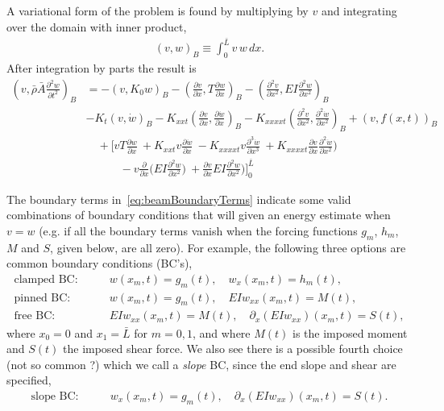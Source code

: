 \documentclass[11pt]{article}
\newcommand{\rhos}{\bar{\rho}}
\newcommand{\As}{\bar{A}}
\newcommand{\Ls}{\bar{L}}
\newcommand{\wt}{\dot{w}}
\begin{document}
A variational form of the problem is found by multiplying by $v$ and integrating over the domain with inner product,
\begin{align}
   (v,w)_B \equiv \int_0^{\Ls} v \, w \, dx. 
\end{align}
After integration by parts the result is 
\begin{align}
 \left( v,  \rhos \As \frac{\partial^2 w}{\partial t^2} \right)_B  &= 
                  - \left( v , K_0 w \right)_B
                  - \left( \frac{\partial v}{\partial x} , T \frac{\partial w}{\partial x} \right)_B
                  -\left(\frac{\partial^2 v}{\partial x^2}, E I \frac{\partial^2 w}{\partial x^2}\right)_B  \\
            & - K_{t} \left( v ,\wt \right)_B
              - K_{xxt} \left( \frac{\partial v}{\partial x} ,\frac{\partial \wt}{\partial x} \right)_B
              - K_{xxxxt} \left( \frac{\partial^2 v}{\partial x^2} ,\frac{\partial^2 \wt}{\partial x^2} \right)_B
             + ( v, f(x,t))_B \\
             &\quad  +   \Big[ v T \frac{\partial w}{\partial x} 
                      ~ + K_{xxt}v  \frac{\partial \wt}{\partial x}
                      ~ -K_{xxxxt} v \frac{\partial^3 \wt}{\partial x^3} 
                      ~ + K_{xxxxt} \frac{\partial v}{\partial x}\frac{\partial^2 \wt}{\partial x^2}\Big)  \\
              &\qquad\quad -v \frac{\partial}{\partial x}\Big( E I \frac{\partial^2 w}{\partial x^2}\Big) 
                      ~ + \frac{\partial v}{\partial x}E I \frac{\partial^2 w}{\partial x^2}\Big)  
                      \Big]_0^{\Ls}   \label{eq:beamBoundaryTerms}
\end{align}

The boundary terms in~\eqref{eq:beamBoundaryTerms} indicate some valid combinations of boundary conditions that will given an energy estimate
when $v=w$ (e.g. if all the boundary terms vanish when the forcing functions $g_m$, $h_m$, $M$ and $S$, given below, are all zero). 
For example, the following three options are common boundary conditions (BC's), 
\begin{align}
   \text{clamped BC:}\quad & \quad w(x_m,t)=g_m(t),\quad  w_x(x_m,t)=h_m(t),  \\
   \text{pinned BC:} \quad & \quad w(x_m,t)=g_m(t), \quad E I w_{xx}(x_m,t)=M(t), \\
   \text{free BC:}   \quad & \quad  E I w_{xx}(x_m,t)=M(t), \quad \partial_x( E I w_{xx})(x_m,t)=S(t),
\end{align}
where $x_0=0$ and $x_1=\Ls$ for $m=0,1$, and 
where $M(t)$ is the imposed moment and $S(t)$ the imposed shear force. 
We also see there is a possible fourth choice (not so common ?) which we call a {\em slope} BC, since
the end slope and shear are specified, 
\begin{align}
   \text{slope BC:}\quad & \quad w_x(x_m,t)=g_m(t),\quad  \partial_x( E I w_{xx})(x_m,t)=S(t). 
\end{align}
\end{document}
